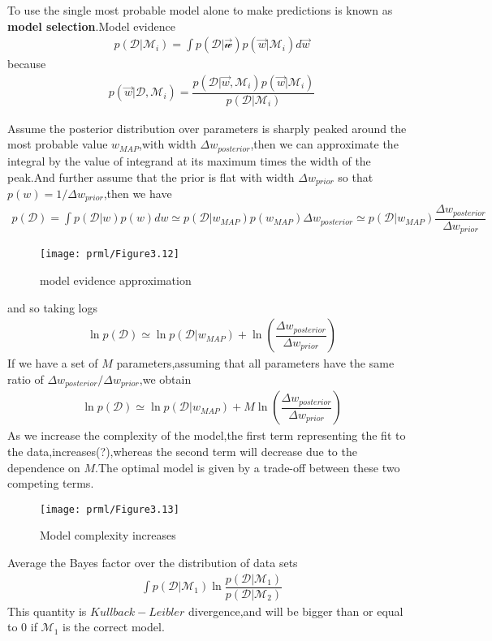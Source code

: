 To use the single most probable model alone to make predictions is known as \textbf{model selection}.Model evidence
\begin{align}
p(\mathcal{D}|\mathcal{M}_i)=\int p(\mathcal{D}|\mathcal{\vec{w}})p(\vec{w}|\mathcal{M}_i)d\vec{w}
\end{align}
because
\begin{align}
p(\vec{w}|\mathcal{D},\mathcal{M}_i)=\dfrac{p(\mathcal{D}|\vec{w},\mathcal{M}_i)p(\vec{w}|\mathcal{M}_i)}{p(\mathcal{D}|\mathcal{M}_i)}
\end{align}

Assume the posterior distribution over parameters is sharply peaked around the most probable value $w_{MAP}$,with width $\Delta w_{posterior}$,then we can approximate the integral by the value of integrand at its maximum times the width of the peak.And further assume that the prior is flat with width $\Delta w_{prior}$ so that $p(w)=1/\Delta w_{prior}$,then we have
\begin{align}
p(\mathcal{D})=\int p(\mathcal{D}|w)p(w)dw \simeq p(\mathcal{D}|w_{MAP})p(w_{MAP})\Delta w_{posterior} \simeq p(\mathcal{D}|w_{MAP})\dfrac{\Delta w_{posterior}}{\Delta w_{prior}}
\end{align}
\begin{SCfigure*}
	\caption{model evidence approximation}
	\texttt{[image: prml/Figure3.12]}
\end{SCfigure*}

and so taking logs
\begin{align}
\ln p(\mathcal{D}) \simeq \ln p(\mathcal{D}|w_{MAP}) +\ln(\dfrac{\Delta w_{posterior}}{\Delta w_{prior}})
\end{align}
If we have a set of $M$ parameters,assuming that all parameters have the same ratio of $\Delta w_{posterior}/\Delta w_{prior}$,we obtain
\begin{align}
\ln p(\mathcal{D}) \simeq \ln p(\mathcal{D}|w_{MAP}) +M\ln(\dfrac{\Delta w_{posterior}}{\Delta w_{prior}})
\end{align}
As we increase the complexity of the model,the first term representing the fit to the data,increases(?),whereas the second term will decrease due to the dependence on $M$.The optimal model is given by a trade-off between these two competing terms.
\begin{SCfigure*}
	\caption{Model complexity increases}
	\texttt{[image: prml/Figure3.13]}
\end{SCfigure*}
Average the Bayes factor over the distribution of data sets
\begin{align}
\int p(\mathcal{D}|\mathcal{M}_1)\ln\dfrac{p(\mathcal{D}|\mathcal{M}_1)}{p(\mathcal{D}|\mathcal{M}_2)}
\end{align}
This quantity is $Kullback-Leibler$ divergence,and will be bigger than or equal to $0$ if $\mathcal{M}_1$ is the correct model.

